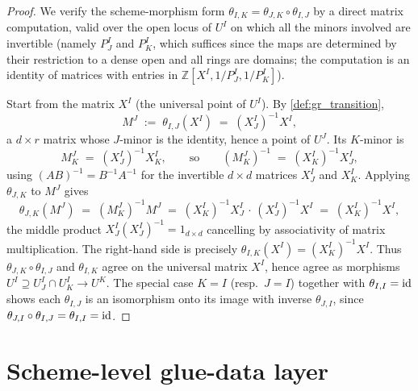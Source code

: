 \begin{proof}
  \leanok
  We verify the scheme-morphism form
  \(\theta_{I,K} = \theta_{J,K} \circ \theta_{I,J}\) by a direct matrix
  computation, valid over the open locus of \(U^I\) on which all the minors
  involved are invertible (namely \(P^I_J\) and \(P^I_K\), which suffices since
  the maps are determined by their restriction to a dense open and all rings are
  domains; the computation is an identity of matrices with entries in
  \(\mathbb{Z}[X^I, 1/P^I_J, 1/P^I_K]\)).

  Start from the matrix \(X^I\) (the universal point of \(U^I\)). By
  \cref{def:gr_transition},
  \[
    M^J \;:=\; \theta_{I,J}(X^I) \;=\; (X^I_J)^{-1} X^I,
  \]
  a \(d \times r\) matrix whose \(J\)-minor is the identity, hence a point of
  \(U^J\). Its \(K\)-minor is
  \[
    M^J_K \;=\; (X^I_J)^{-1} X^I_K,
    \qquad\text{so}\qquad
    (M^J_K)^{-1} \;=\; (X^I_K)^{-1} X^I_J,
  \]
  using \((AB)^{-1} = B^{-1} A^{-1}\) for the invertible \(d \times d\) matrices
  \(X^I_J\) and \(X^I_K\). Applying \(\theta_{J,K}\) to \(M^J\) gives
  \[
    \theta_{J,K}(M^J) \;=\; (M^J_K)^{-1} M^J
    \;=\; (X^I_K)^{-1} X^I_J \,\cdot\, (X^I_J)^{-1} X^I
    \;=\; (X^I_K)^{-1} X^I,
  \]
  the middle product \(X^I_J (X^I_J)^{-1} = 1_{d\times d}\) cancelling by
  associativity of matrix multiplication. The right-hand side is precisely
  \(\theta_{I,K}(X^I) = (X^I_K)^{-1} X^I\). Thus
  \(\theta_{J,K} \circ \theta_{I,J}\) and \(\theta_{I,K}\) agree on the
  universal matrix \(X^I\), hence agree as morphisms \(U^I \supseteq U^I_J \cap
  U^I_K \to U^K\). The special case \(K = I\) (resp.\ \(J = I\)) together with
  \(\theta_{I,I} = \operatorname{id}\) shows each \(\theta_{I,J}\) is an isomorphism onto its
  image with inverse \(\theta_{J,I}\), since
  \(\theta_{J,I} \circ \theta_{I,J} = \theta_{I,I} = \operatorname{id}\).
\end{proof}

\section{Scheme-level glue-data layer}
\label{sec:gr_glue_layer}

